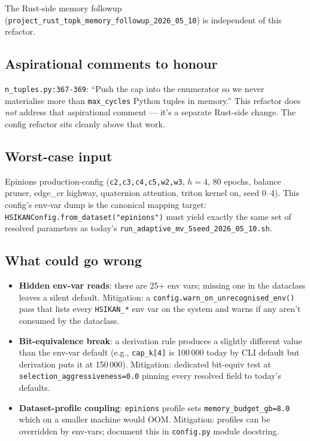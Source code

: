 \documentclass[11pt,a4paper]{article}
\begin{document}
The Rust-side memory followup
(\texttt{project\_rust\_topk\_memory\_followup\_2026\_05\_10}) is
independent of this refactor.

\subsection*{Aspirational comments to honour}
\texttt{n\_tuples.py:367-369}: ``Push the cap into the enumerator so
we never materialise more than \texttt{max\_cycles} Python tuples in
memory.''  This refactor does \emph{not} address that aspirational
comment --- it's a separate Rust-side change.  The config refactor
sits cleanly above that work.

\subsection*{Worst-case input}
Epinions production-config (\texttt{c2,c3,c4,c5,w2,w3}, $h{=}4$,
80 epochs, balance pruner, edge\_cr highway, quaternion attention,
triton kernel on, seed 0--4).  This config's env-var dump is the
canonical mapping target: \texttt{HSIKANConfig.from\_dataset("epinions")}
must yield exactly the same set of resolved parameters as today's
\texttt{run\_adaptive\_mv\_5seed\_2026\_05\_10.sh}.

\subsection*{What could go wrong}
\begin{itemize}
\item \textbf{Hidden env-var reads}: there are 25+ env vars; missing
  one in the dataclass leaves a silent default.  Mitigation: a
  \texttt{config.warn\_on\_unrecognised\_env()} pass that lists every
  \texttt{HSIKAN\_*} env var on the system and warns if any aren't
  consumed by the dataclass.
\item \textbf{Bit-equivalence break}: a derivation rule produces a
  slightly different value than the env-var default
  (e.g., \texttt{cap\_k[4]} is 100\,000 today by CLI default but
  derivation puts it at 150\,000).  Mitigation: dedicated bit-equiv
  test at \texttt{selection\_aggressiveness=0.0} pinning every
  resolved field to today's defaults.
\item \textbf{Dataset-profile coupling}: \texttt{epinions} profile sets
  \texttt{memory\_budget\_gb=8.0} which on a smaller machine would
  OOM.  Mitigation: profiles can be overridden by env-vars; document
  this in \texttt{config.py} module docstring.
\end{itemize}
\end{document}
